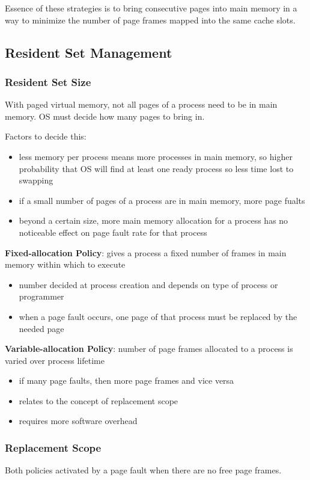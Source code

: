 \documentclass[11pt]{article}
\begin{document}
Essence of these strategies is to bring consecutive pages into main memory in a way
to minimize the number of page frames mapped into the same cache slots.
\subsection{Resident Set Management}
\label{sec:org96f51b2}
\subsubsection{Resident Set Size}
\label{sec:orgf3a6ed8}
With paged virtual memory, not all pages of a process need to be in main memory.
OS must decide how many pages to bring in.

Factors to decide this:
\begin{itemize}
\item less memory per process means more processes in main memory, so higher probability
that OS will find at least one ready process so less time lost to swapping
\item if a small number of pages of a process are in main memory, more page fualts
\item beyond a certain size, more main memory allocation for a process has no
noticeable effect on page fault rate for that process
\end{itemize}

\textbf{Fixed-allocation Policy}: gives a process a fixed number of frames in main memory
within which to execute
\begin{itemize}
\item number decided at process creation and depends on type of process or programmer
\item when a page fault occurs, one page of that process must be replaced by the needed
page
\end{itemize}

\textbf{Variable-allocation Policy}: number of page frames allocated to a process is
varied over process lifetime
\begin{itemize}
\item if many page faults, then more page frames and vice versa
\item relates to the concept of replacement scope
\item requires more software overhead
\end{itemize}
\subsubsection{Replacement Scope}
\label{sec:org0b2b72c}
Both policies activated by a page fault when there are no free page frames.
\end{document}

